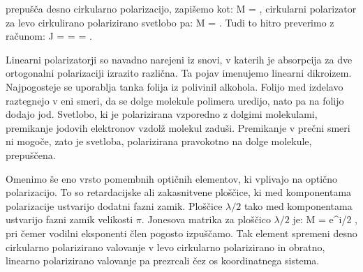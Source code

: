 prepušča desno cirkularno polarizacijo, zapišemo kot:
\beq
M = \left[\begin{array}{cc}
1 & i \\
-i & 1\\
\end{array}\right]\!\!, 
\label{eq:03_52}
\eeq
cirkularni polarizator za levo cirkulirano polarizirano svetlobo pa:
\beq
M = \left[\begin{array}{cc}
1 & -i \\
i & 1\\
\end{array}\right]\!\!.
\label{eq:03_53}
\eeq
Tudi to hitro preverimo z računom:
\beq
J = \left[\begin{array}{cc}
1 & \pm i \\
\mp i & 1\\
\end{array}\right]\cdot 
\left[\begin{array}{c}
J_{1x}\\
J_{1y}\\
\end{array}\right]\!\! = 
\left[\begin{array}{c}
J_{1x} \pm i J_{1y}\\
\mp i J_{1x} + J_{1y}\\
\end{array}\right]\!\!=
\left[\begin{array}{c}
1\\
\mp i\\
\end{array}\right]\!\!.
\label{eq:03_54}
\eeq

\begin{remark}
Linearni polarizatorji so navadno narejeni iz snovi, v
katerih je absorpcija za dve ortogonalni polarizaciji izrazito različna.
Ta pojav imenujemo linearni dikroizem. Najpogosteje se uporablja
tanka folija iz polivinil alkohola. Folijo med izdelavo raztegnejo v
eni smeri, da se dolge molekule polimera uredijo, nato pa na folijo
dodajo jod. Svetlobo, ki je polarizirana vzporedno z dolgimi molekulami,
premikanje jodovih elektronov vzdolž molekul zaduši. Premikanje v prečni
smeri ni mogoče, zato je svetloba, polarizirana pravokotno na dolge
molekule, prepuščena. 
\end{remark}

Omenimo še eno vrsto pomembnih optičnih elementov, ki vplivajo na optično
polarizacijo. To so retardacijske ali zakasnitvene ploščice, ki med 
komponentama polarizacije ustvarijo dodatni fazni zamik. 
Ploščice $\lambda/2$ tako med komponentama
ustvarijo fazni zamik velikosti $\pi$. Jonesova matrika za ploščico $\lambda/2$ je:
\beq
M = e^{\pm i\pi/2}
\left[\begin{array}{cc}
1 & 0 \\
0 & -1\\
\end{array}\right]\!\!,
\label{eq:03_55}
\eeq
pri čemer vodilni eksponenti člen pogosto izpuščamo. 
Tak element spremeni desno cirkularno polarizirano valovanje v levo cirkularno polarizirano
in obratno, linearno polarizirano valovanje pa prezrcali čez os koordinatnega sistema.

